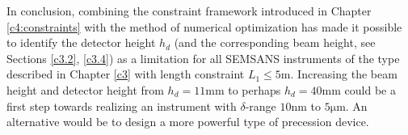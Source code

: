In conclusion, combining the constraint framework introduced in Chapter \ref{c4:constraints} with the method of numerical optimization has made it possible to identify the detector height $h_d$ (and the corresponding beam height, see Sections \ref{c3.2}, \ref{c3.4}) as a limitation for all SEMSANS instruments of the type described in Chapter \ref{c3} with length constraint $L_1 \leq 5 \unit\meter$. Increasing the beam height and detector height from $h_d = 11\unit{\milli\meter}$ to perhaps $h_d = 40\unit{\milli\meter}$ could be a first step towards realizing an instrument with $\delta$-range $10 \unit{\nano\meter}$ to $5 \unit{\micro\meter}$. An alternative would be to design a more powerful type of precession device.





